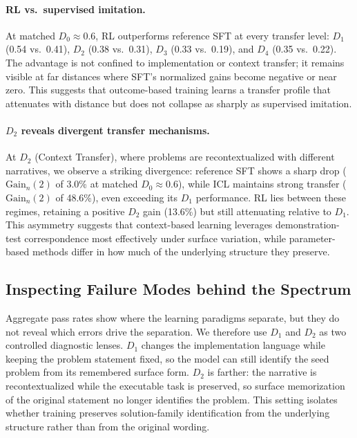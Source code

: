 \documentclass[]{bytedance_seed}
\theoremstyle{plain}
\theoremstyle{definition}
\theoremstyle{remark}
\begin{document}
\paragraph{RL vs.\ supervised imitation.}
At matched $D_0{\approx}0.6$, RL outperforms reference SFT at every transfer level: $D_1$ (0.54 vs.\ 0.41), $D_2$ (0.38 vs.\ 0.31), $D_3$ (0.33 vs.\ 0.19), and $D_4$ (0.35 vs.\ 0.22). The advantage is not confined to implementation or context transfer; it remains visible at far distances where SFT's normalized gains become negative or near zero. This suggests that outcome-based training learns a transfer profile that attenuates with distance but does not collapse as sharply as supervised imitation.

\paragraph{$D_2$ reveals divergent transfer mechanisms.}
At $D_2$ (Context Transfer), where problems are recontextualized with different narratives, we observe a striking divergence: reference SFT shows a sharp drop ($\text{Gain}_n(2)$ of 3.0\% at matched $D_0{\approx}0.6$), while ICL maintains strong transfer ($\text{Gain}_n(2)$ of 48.6\%), even exceeding its $D_1$ performance. RL lies between these regimes, retaining a positive $D_2$ gain (13.6\%) but still attenuating relative to $D_1$. This asymmetry suggests that context-based learning leverages demonstration-test correspondence most effectively under surface variation, while parameter-based methods differ in how much of the underlying structure they preserve.

\subsection{Inspecting Failure Modes behind the Spectrum}
\label{sec:case_study}

Aggregate pass rates show where the learning paradigms separate, but they do not reveal which errors drive the separation. We therefore use $D_1$ and $D_2$ as two controlled diagnostic lenses. $D_1$ changes the implementation language while keeping the problem statement fixed, so the model can still identify the seed problem from its remembered surface form. $D_2$ is farther: the narrative is recontextualized while the executable task is preserved, so surface memorization of the original statement no longer identifies the problem. This setting isolates whether training preserves solution-family identification from the underlying structure rather than from the original wording.
\end{document}
